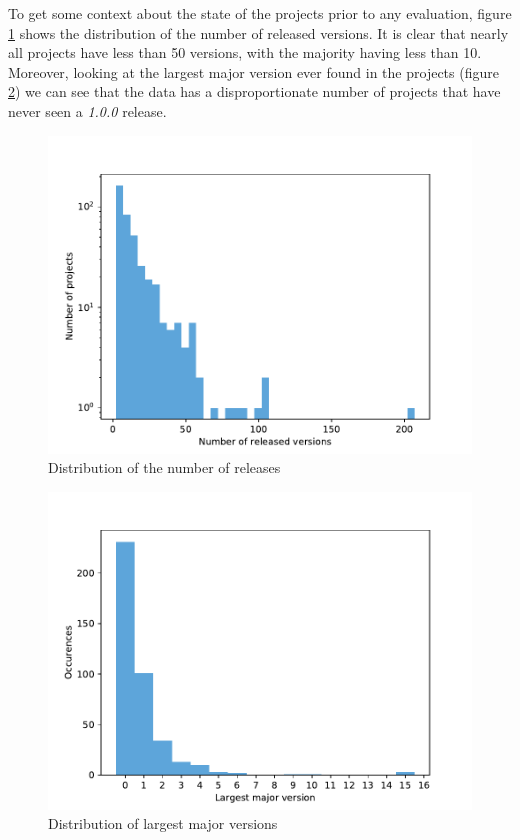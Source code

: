 \documentclass{l4proj}
\begin{document}
To get some context about the state of the projects prior to any
evaluation, figure \ref{DistributionAllVersions} shows the
distribution of the number of released versions. It is clear that
nearly all projects have less than 50 versions, with the majority
having less than 10. Moreover, looking at the largest major version
ever found in the projects (figure \ref{DistributionLargestMajor}) we
can see that the data has a disproportionate number of projects that
have never seen a \textit{1.0.0} release.

\begin{figure}[]
\centering
\includegraphics[height=0.4\textheight]{images/evaluation/distribution_all_versions}
\caption{Distribution of the number of releases}
\label{DistributionAllVersions}
\end{figure}

\begin{figure}[]
\centering
\includegraphics[height=0.4\textheight]{images/evaluation/distribution_major_versions}
\caption{Distribution of largest major versions}
\label{DistributionLargestMajor}
\end{figure}
\end{document}
